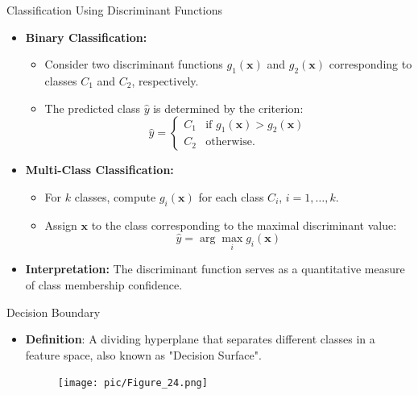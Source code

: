 \documentclass[serif, aspectratio=169]{beamer}
\begin{document}
\begin{frame}{Classification Using Discriminant Functions}
    \begin{itemize}\itemsep1.5em
        \item \textbf{Binary Classification:}\\
        \begin{itemize}
            \item Consider two discriminant functions $g_1(\mathbf{x})$ and $g_2(\mathbf{x})$ corresponding to classes $C_1$ and $C_2$, respectively.
            \item The predicted class $\hat{y}$ is determined by the criterion:
            \[
                \hat{y} =
                \begin{cases} 
                    C_1 & \text{if } g_1(\mathbf{x}) > g_2(\mathbf{x}) \\
                    C_2 & \text{otherwise.}
                \end{cases}
            \]
        \end{itemize}

        \item \textbf{Multi-Class Classification:}\\
        \begin{itemize}
            \item For $k$ classes, compute $g_i(\mathbf{x})$ for each class $C_i$, $i=1,\dots,k$.
            \item Assign $\mathbf{x}$ to the class corresponding to the maximal discriminant value:
            \[
                \hat{y} = \arg \max_{i} g_i(\mathbf{x})
            \]
        \end{itemize}

        \item \textbf{Interpretation:}
        The discriminant function serves as a quantitative measure of class membership confidence.
    \end{itemize}
\end{frame}


\begin{frame}{Decision Boundary}
    \begin{itemize}
        \item \justifying \textbf{Definition}: A dividing hyperplane that separates different classes in a feature space, also known as "Decision Surface".
        \medskip
        \begin{figure}
            \centering
            \texttt{[image: pic/Figure\_24.png]}
        \end{figure}
    \end{itemize}
\end{frame}
\end{document}
